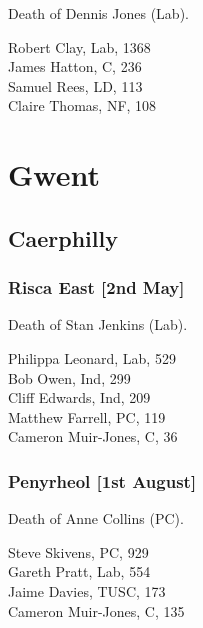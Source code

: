 \documentclass[a4paper,openany,10pt]{book}
\begin{document}

Death of Dennis Jones (Lab).



Robert Clay, Lab, 1368\\
James Hatton, C, 236\\
Samuel Rees, LD, 113\\
Claire Thomas, NF, 108\\


\section{Gwent}

\subsection*{Caerphilly}

\subsubsection*{Risca East \hspace*{\fill}\nolinebreak[1]%
\enspace\hspace*{\fill}
[2nd May]}


Death of Stan Jenkins (Lab).



Philippa Leonard, Lab, 529\\
Bob Owen, Ind, 299\\
Cliff Edwards, Ind, 209\\
Matthew Farrell, PC, 119\\
Cameron Muir-Jones, C, 36\\


\subsubsection*{Penyrheol \hspace*{\fill}\nolinebreak[1]%
\enspace\hspace*{\fill}
[1st August]}


Death of Anne Collins (PC).



Steve Skivens, PC, 929\\
Gareth Pratt, Lab, 554\\
Jaime Davies, TUSC, 173\\
Cameron Muir-Jones, C, 135\\
\end{document}
